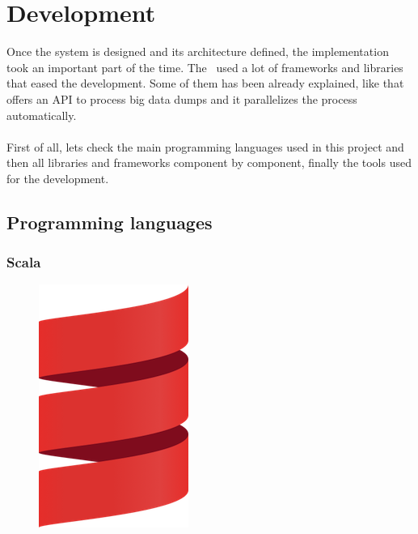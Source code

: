 
\chapter{Development}

\label{chapter07}

Once the system is designed and its architecture defined, the implementation took an important part of the time. The \thesis\ used a lot of frameworks and libraries that eased the development. Some of them has been already explained, like  that offers an API to process big data dumps and it parallelizes the process automatically.
\\\\
First of all, lets check the main programming languages used in this project and then all libraries and frameworks component by component, finally the tools used for the development.

\section{Programming languages}

\subsection*{Scala\cite{scala}}

\begin{figure}[H]
\includegraphics[scale=0.1]{resources/scala-logo.png}
\end{figure}

